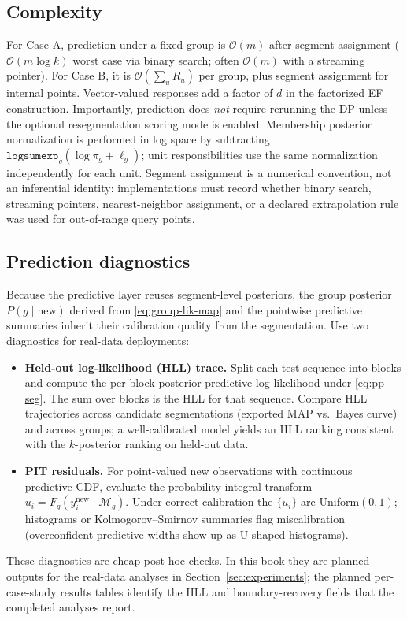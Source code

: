 \subsection{Complexity}
For Case A, prediction under a fixed group is $\mathcal{O}(m)$ after segment assignment
($\mathcal{O}(m\log k)$ worst case via binary search; often $\mathcal{O}(m)$ with a streaming pointer).
For Case B, it is $\mathcal{O}(\sum_u R_u)$ per group, plus segment assignment for internal points.
Vector-valued responses add a factor of $d$ in the factorized EF construction. Importantly,
prediction does \emph{not} require rerunning the DP unless the optional resegmentation scoring
mode is enabled.
Membership posterior normalization is performed in log space by subtracting
$\texttt{logsumexp}_g(\log\pi_g+\ell_g)$; unit responsibilities use the same normalization
independently for each unit. Segment assignment is a numerical convention, not an inferential
identity: implementations must record whether binary search, streaming pointers, nearest-neighbor
assignment, or a declared extrapolation rule was used for out-of-range query points.
\subsection{Prediction diagnostics}
\label{sec:prediction-diagnostics}

Because the predictive layer reuses segment-level posteriors, the group posterior
$P(g\mid\text{new})$ derived from \eqref{eq:group-lik-map} and the pointwise predictive summaries
inherit their calibration quality from the segmentation. Use two diagnostics for real-data
deployments:
\begin{itemize}\itemsep2pt
\item \textbf{Held-out log-likelihood (HLL) trace.} Split each test sequence into blocks and
compute the per-block posterior-predictive log-likelihood under \eqref{eq:pp-seg}. The sum over
blocks is the HLL for that sequence. Compare HLL trajectories across candidate segmentations
(exported MAP vs.\ Bayes curve) and across groups; a well-calibrated model yields an HLL
ranking consistent with the $k$-posterior ranking on held-out data.
\item \textbf{PIT residuals.} For point-valued new observations with continuous predictive CDF,
evaluate the probability-integral transform $u_i=F_g(y_i^{\text{new}}\mid\mathcal{M}_g)$.
Under correct calibration the $\{u_i\}$ are Uniform$(0,1)$; histograms or Kolmogorov--Smirnov
summaries flag miscalibration (overconfident predictive widths show up as U-shaped histograms).
\end{itemize}
These diagnostics are cheap post-hoc checks. In this book they are planned outputs
for the real-data analyses in Section~\ref{sec:experiments}; the planned per-case-study results tables
identify the HLL and boundary-recovery fields that the completed analyses report.
